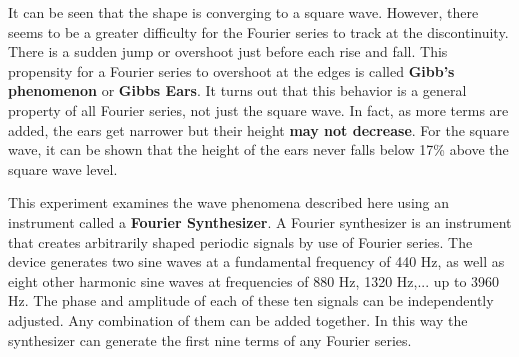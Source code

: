 It can be seen that the shape is converging to a square wave. However, there seems to be a greater difficulty for the Fourier series to track at the discontinuity. There is a sudden jump or overshoot just before each rise and fall. This propensity for a Fourier series to overshoot at the edges is called {\bf Gibb's phenomenon} or {\bf Gibbs Ears}. It turns out that this behavior is a general property of all Fourier series, not just the square wave. In fact, as more terms are added, the ears get narrower but their height {\bf may not decrease}. For the square wave, it can be shown that the height of the ears never falls below 17\% above the square wave level.

This experiment examines the wave phenomena described here using an instrument called a {\bf Fourier Synthesizer}. A Fourier synthesizer is an instrument that creates arbitrarily shaped periodic signals by use of Fourier series. The device generates two sine waves at a fundamental frequency of 440 Hz, as well as eight other harmonic sine waves at frequencies of 880 Hz, 1320 Hz,... up to 3960 Hz. The phase and amplitude of each of these ten signals can be independently adjusted. Any combination of them can be added together. In this way the synthesizer can generate the first nine terms of any Fourier series.

